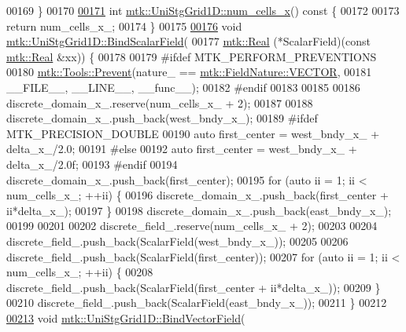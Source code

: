 \begin{DoxyCode}
00169 \}
00170 
\hypertarget{mtk__uni__stg__grid__1d_8cc_source_l00171}{}\hyperlink{classmtk_1_1UniStgGrid1D_af1b3729d8afa07be5b2775ed68015b80}{00171} \textcolor{keywordtype}{int} \hyperlink{classmtk_1_1UniStgGrid1D_af1b3729d8afa07be5b2775ed68015b80}{mtk::UniStgGrid1D::num\_cells\_x}()\textcolor{keyword}{ const }\{
00172 
00173   \textcolor{keywordflow}{return} num\_cells\_x\_;
00174 \}
00175 
\hypertarget{mtk__uni__stg__grid__1d_8cc_source_l00176}{}\hyperlink{classmtk_1_1UniStgGrid1D_ab49f0009b66b0a58ae7f70a538f4d12b}{00176} \textcolor{keywordtype}{void} \hyperlink{classmtk_1_1UniStgGrid1D_ab49f0009b66b0a58ae7f70a538f4d12b}{mtk::UniStgGrid1D::BindScalarField}(
00177     \hyperlink{group__c01-roots_gac080bbbf5cbb5502c9f00405f894857d}{mtk::Real} (*ScalarField)(\textcolor{keyword}{const} \hyperlink{group__c01-roots_gac080bbbf5cbb5502c9f00405f894857d}{mtk::Real} &xx)) \{
00178 
00179 \textcolor{preprocessor}{  #ifdef MTK\_PERFORM\_PREVENTIONS}
00180   \hyperlink{classmtk_1_1Tools_a332324c6f25e66be9dff48c5987a3b9f}{mtk::Tools::Prevent}(nature\_ == \hyperlink{namespacemtk_ga4c54f2a329cfb4e56213b02a259d19e2a87752381b583740610f1dfeb07fdad7e}{mtk::FieldNature::VECTOR},
00181                       \_\_FILE\_\_, \_\_LINE\_\_, \_\_func\_\_);
00182 \textcolor{preprocessor}{  #endif}
00183 
00185 
00186   discrete\_domain\_x\_.reserve(num\_cells\_x\_ + 2);
00187 
00188   discrete\_domain\_x\_.push\_back(west\_bndy\_x\_);
00189 \textcolor{preprocessor}{  #ifdef MTK\_PRECISION\_DOUBLE}
00190   \textcolor{keyword}{auto} first\_center = west\_bndy\_x\_ + delta\_x\_/2.0;
00191 \textcolor{preprocessor}{  #else}
00192   \textcolor{keyword}{auto} first\_center = west\_bndy\_x\_ + delta\_x\_/2.0f;
00193 \textcolor{preprocessor}{  #endif}
00194   discrete\_domain\_x\_.push\_back(first\_center);
00195   \textcolor{keywordflow}{for} (\textcolor{keyword}{auto} ii = 1; ii < num\_cells\_x\_; ++ii) \{
00196     discrete\_domain\_x\_.push\_back(first\_center + ii*delta\_x\_);
00197   \}
00198   discrete\_domain\_x\_.push\_back(east\_bndy\_x\_);
00199 
00201 
00202   discrete\_field\_.reserve(num\_cells\_x\_ + 2);
00203 
00204   discrete\_field\_.push\_back(ScalarField(west\_bndy\_x\_));
00205 
00206   discrete\_field\_.push\_back(ScalarField(first\_center));
00207   \textcolor{keywordflow}{for} (\textcolor{keyword}{auto} ii = 1; ii < num\_cells\_x\_; ++ii) \{
00208     discrete\_field\_.push\_back(ScalarField(first\_center + ii*delta\_x\_));
00209   \}
00210   discrete\_field\_.push\_back(ScalarField(east\_bndy\_x\_));
00211 \}
00212 
\hypertarget{mtk__uni__stg__grid__1d_8cc_source_l00213}{}\hyperlink{classmtk_1_1UniStgGrid1D_a5703f1f875f52f6de8f7db5a6250fafa}{00213} \textcolor{keywordtype}{void} \hyperlink{classmtk_1_1UniStgGrid1D_a5703f1f875f52f6de8f7db5a6250fafa}{mtk::UniStgGrid1D::BindVectorField}(

\end{DoxyCode}
